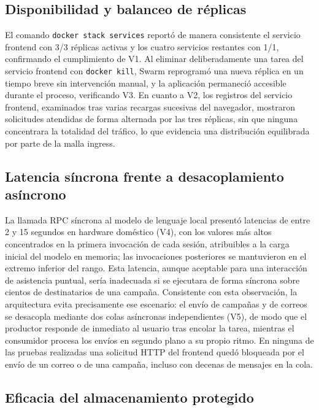 \subsection{Disponibilidad y balanceo de réplicas}

El comando \texttt{docker stack services} reportó de manera consistente el
servicio frontend con 3/3 réplicas activas y los cuatro servicios restantes
con 1/1, confirmando el cumplimiento de V1. Al eliminar deliberadamente una
tarea del servicio frontend con \texttt{docker kill}, Swarm reprogramó una
nueva réplica en un tiempo breve sin intervención manual, y la aplicación
permaneció accesible durante el proceso, verificando V3. En cuanto a V2, los
registros del servicio frontend, examinados tras varias recargas sucesivas
del navegador, mostraron solicitudes atendidas de forma alternada por las
tres réplicas, sin que ninguna concentrara la totalidad del tráfico, lo que
evidencia una distribución equilibrada por parte de la malla ingress.

\subsection{Latencia síncrona frente a desacoplamiento asíncrono}

La llamada RPC síncrona al modelo de lenguaje local presentó latencias de
entre 2 y 15 segundos en hardware doméstico (V4), con los valores más altos
concentrados en la primera invocación de cada sesión, atribuibles a la carga
inicial del modelo en memoria; las invocaciones posteriores se mantuvieron en
el extremo inferior del rango. Esta latencia, aunque aceptable para una
interacción de asistencia puntual, sería inadecuada si se ejecutara de forma
síncrona sobre cientos de destinatarios de una campaña. Consistente con esta
observación, la arquitectura evita precisamente ese escenario: el envío de
campañas y de correos se desacopla mediante dos colas asíncronas
independientes (V5), de modo que el productor responde de inmediato al
usuario tras encolar la tarea, mientras el consumidor procesa los envíos en
segundo plano a su propio ritmo. En ninguna de las pruebas realizadas una
solicitud HTTP del frontend quedó bloqueada por el envío de un correo o de
una campaña, incluso con decenas de mensajes en la cola.

\subsection{Eficacia del almacenamiento protegido}

